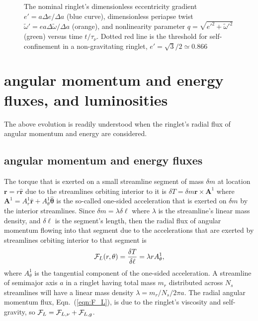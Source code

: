 \documentclass[preprint]{aastex62}
\begin{document}
\begin{figure}
    \caption{
        \label{fig:de_prime_nominal}
        The nominal ringlet's dimensionless eccentricity gradient $e' = a\Delta e/\Delta a$
        (blue curve), dimensionless periapse twist $\tilde{\omega}' = ea\Delta\tilde{\omega}/\Delta a$
        (orange), and nonlinearity parameter $q=\sqrt{e'^2 + \tilde{\omega}'^2}$
        (green) versus time $t/\tau_\nu$. Dotted red line 
        is the threshold for self-confinement in a non-gravitating ringlet, $e'=\sqrt{3}/2\simeq0.866$
    }
\end{figure}\vfil


\section{angular momentum and energy fluxes, and luminosities}
\label{sec:fluxes}

The above evolution is readily understood when the ringlet's 
radial flux of angular momentum and energy are considered. 

\subsection{angular momentum and energy fluxes}
\label{subsec:fluxes}

The torque that is exerted on a small streamline segment of mass $\delta m$
at location $\mathbf{r}=r\hat{\mathbf{r}}$
due to the streamlines orbiting interior to it is $\delta T=\delta m\mathbf{r}\times\mathbf{A}^1$ where 
$\mathbf{A}^1=A^1_r\hat{\mathbf{r}} + A^1_\theta\hat{\boldsymbol\theta}$
is the so-called one-sided acceleration that is exerted on $\delta m$ by the interior streamlines. 
Since $\delta m=\lambda\delta\ell$ where $\lambda$ is the streamline's linear mass density,
and $\delta\ell$ is the segment's length, then the radial flux of angular momentum flowing into
that segment due to the accelerations that are exerted by streamlines orbiting interior to that
segment is
\begin{equation}
    \label{eqn:F_L}
    {\cal F}_L(r, \theta) = \frac{\delta T}{\delta\ell} = \lambda r A^1_\theta,
\end{equation}
where $A^1_\theta$ is the tangential component of the one-sided acceleration.
A streamline of semimajor axis $a$ in a ringlet having total mass $m_r$ 
distributed across $N_s$ streamlines will have a linear mass density $\lambda=m_r/N_s/2\pi a$.
The radial angular momentum flux, Eqn.\ (\ref{eqn:F_L}), is due to the ringlet's viscosity and self-gravity,
so ${\cal F}_L = {\cal F}_{L,\nu} + {\cal F}_{L,g}$. 
\end{document}
